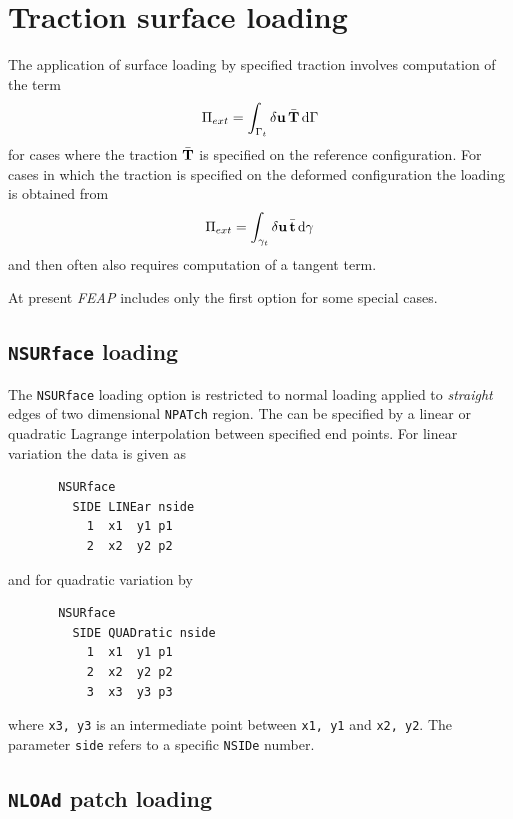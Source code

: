 \section{Traction surface loading}

The application of surface loading by specified traction involves computation
of the term
\begin{displaymath}
\Pi_{ext} = \int_{\Gamma_t} \delta \mathbf{u} \, \bar{\mathbf{T}} \, \mathrm{d} \Gamma
\end{displaymath}
for cases where the traction $\bar{\mathbf{T}}$ is specified on the reference
configuration.
For cases in which the traction is specified on the deformed configuration
the loading is obtained from
\begin{displaymath}
\Pi_{ext} = \int_{\gamma_t} \delta \mathbf{u} \, \bar{\mathbf{t}} \, \mathrm{d} \gamma
\end{displaymath}
and then often also requires computation of a tangent term.

At present \textsl{FEAP} includes only the first option for some special cases.

\subsection{\texttt{NSURface} loading}

The \texttt{NSURface} loading option is restricted to normal loading applied
to \textit{straight} edges of two dimensional \texttt{NPATch} region.
The can be specified by a linear or quadratic Lagrange interpolation between
specified end points.  For linear variation the data is given as
\begin{verbatim}
       NSURface
         SIDE LINEar nside
           1  x1  y1 p1
           2  x2  y2 p2
\end{verbatim}
and for quadratic variation by
\begin{verbatim}
       NSURface
         SIDE QUADratic nside
           1  x1  y1 p1
           2  x2  y2 p2
           3  x3  y3 p3
\end{verbatim}
where \texttt{x3, y3} is an intermediate point between \texttt{x1, y1}
and \texttt{x2, y2}.  The parameter \texttt{side} refers to a specific
\texttt{NSIDe} number.

\subsection{\texttt{NLOAd} patch loading}

